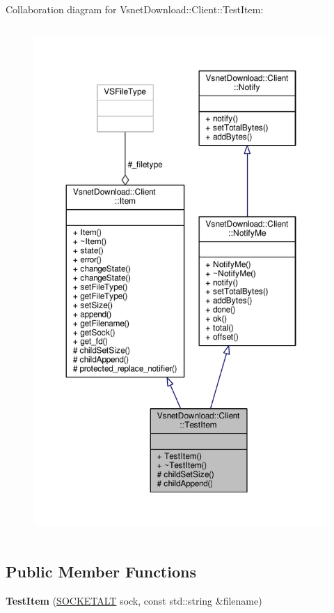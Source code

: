 Collaboration diagram for Vsnet\+Download\+:\+:Client\+:\+:Test\+Item\+:
\nopagebreak
\begin{figure}[H]
\begin{center}
\leavevmode
\includegraphics[height=550pt]{d6/d1f/classVsnetDownload_1_1Client_1_1TestItem__coll__graph}
\end{center}
\end{figure}
\subsection*{Public Member Functions}
\begin{DoxyCompactItemize}
\item 
{\bfseries Test\+Item} (\hyperlink{classSOCKETALT}{S\+O\+C\+K\+E\+T\+A\+LT} sock, const std\+::string \&filename)\hypertarget{classVsnetDownload_1_1Client_1_1TestItem_a6f9bcfa33bf31d5988be85b49825f677}{}\label{classVsnetDownload_1_1Client_1_1TestItem_a6f9bcfa33bf31d5988be85b49825f677}

\end{DoxyCompactItemize}
